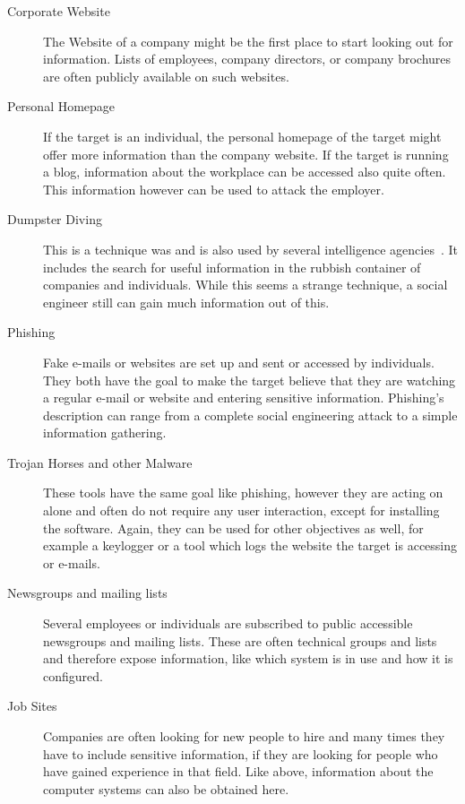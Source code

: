 \begin{description}

\item[Corporate Website] The Website of a company might be the first place to
  start looking out for information. Lists of employees,
  company directors, or company brochures are often publicly available on such websites. 
\item[Personal Homepage] If the target is an individual, the personal homepage
  of the target might offer more information than the company website. If the
  target is running a blog, information about the workplace can be accessed
  also quite often. This information however can be used to attack the
  employer.
\item[Dumpster Diving] This is a technique was and is also used by several
  intelligence agencies~\cite{lively2003}. It includes the search
  for useful information in the rubbish container of companies and individuals. While
  this seems a strange technique, a social engineer still can gain much
  information out of this.
\item[Phishing] Fake e-mails or websites are set up and sent or accessed by
  individuals. They both have the goal to make the target believe that they are
  watching a regular e-mail or website and entering sensitive information.
  Phishing's description can range from a complete social engineering attack to
  a simple information gathering.
\item[Trojan Horses and other Malware] These tools have the same goal like
  phishing, however they are acting on alone and often do not require any
  user interaction, except for installing the software. Again, they can
  be used for other objectives as well, for example a keylogger or a tool
  which logs the website the target is accessing or e-mails.
\item[Newsgroups and mailing lists] Several employees or individuals are
  subscribed to public accessible newsgroups and mailing lists. These are often
  technical groups and lists and therefore expose information, like which system
  is in use and how it is configured.
\item[Job Sites] Companies are often looking for new people to hire and many
  times they have to include sensitive information, if they are looking for
  people who have gained experience in that field. Like above, information about the
  computer systems can also be obtained here.
\end{description}

